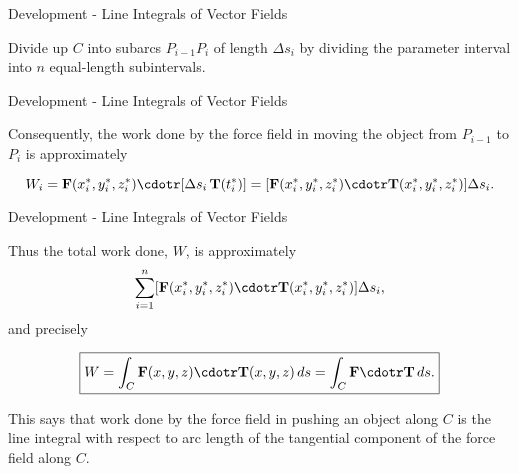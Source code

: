 \documentclass[11pt,english,
handout
]{beamer}
\begin{document}
\begin{frame}[t]{Development - Line Integrals of Vector Fields}

\small
Divide up $C$ into subarcs $P_{i-1}P_i$ of length $\Delta s_i$ by dividing the parameter interval into $n$ equal-length subintervals.  

\end{frame}















\begin{frame}[t]{Development - Line Integrals of Vector Fields}

\small
Consequently, the work done by the force field in moving the object from $P_{i-1}$ to $P_i$ is approximately

\[
W_i=\mathbf{F}(x_i^*,y_i^*,z_i^*)\cdotr[\Delta s_i\,\mathbf{T}(t_i^*)]= [\mathbf{F}(x_i^*,y_i^*,z_i^*)\cdotr\mathbf{T}(x_i^*,y_i^*,z_i^*)]\Delta s_i.
\]

\vspace{0.1mm}
\end{frame}








\begin{frame}[t]{Development - Line Integrals of Vector Fields}
\small

Thus the total work done, $W$, is approximately 
\[
\sum_{i=1}^n [\mathbf{F}(x_i^*,y_i^*,z_i^*)\cdotr\mathbf{T}(x_i^*,y_i^*,z_i^*)]\Delta s_i,
\]
and precisely

\[
\boxed{W=\int_C\mathbf{F}(x,y,z)\cdotr\mathbf{T}(x,y,z)\,ds=\int_C \mathbf{F}\cdotr \mathbf{T}\,ds.}
\]

\lspace
This says that work done by the force field in pushing an object along $C$ is the line integral with respect to arc length of the tangential component of the force field along $C$.
\end{frame}
\end{document}
